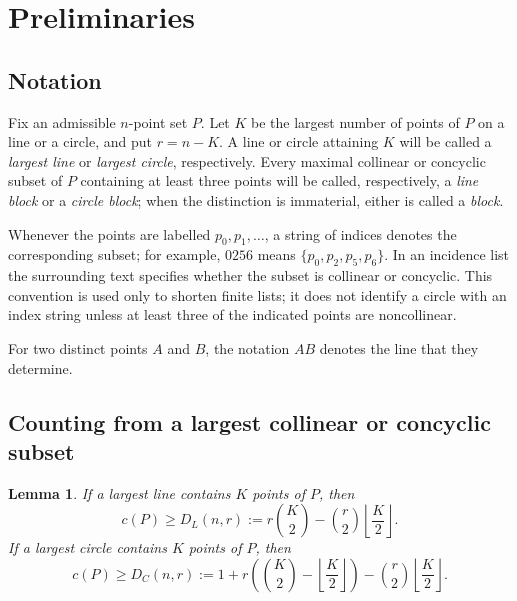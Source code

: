 \documentclass[11pt,a4paper]{article}
\newtheorem{lemma}[theorem]{Lemma}
\theoremstyle{definition}
\begin{document}
\section{Preliminaries}

\subsection{Notation}

Fix an admissible $n$-point set $P$.  Let $K$ be the largest number of points of
$P$ on a line or a circle, and put $r=n-K$.  A line or circle attaining $K$ will be
called a \emph{largest line} or \emph{largest circle}, respectively.
Every maximal collinear or concyclic subset of $P$ containing at least three
points will be called, respectively, a \emph{line block} or a \emph{circle block};
when the distinction is immaterial, either is called a \emph{block}.

Whenever the points are labelled $p_0,p_1,\ldots$, a string of indices denotes
the corresponding subset; for example, $0256$ means
$\{p_0,p_2,p_5,p_6\}$.  In an incidence list the surrounding text specifies
whether the subset is collinear or concyclic.  This convention is used only to
shorten finite lists; it does not identify a circle with an index string unless
at least three of the indicated points are noncollinear.

For two distinct points $A$ and $B$, the notation $AB$ denotes the line that
they determine.

\subsection{Counting from a largest collinear or concyclic subset}

\begin{lemma}\label{lem:largest-en}
If a largest line contains $K$ points of $P$, then
\begin{equation}\label{eq:DL-en}
c(P)\ge D_L(n,r):=r\binom K2-\binom r2\left\lfloor\frac K2\right\rfloor.
\end{equation}
If a largest circle contains $K$ points of $P$, then
\begin{equation}\label{eq:DC-en}
c(P)\ge D_C(n,r):=1+r\left(\binom K2-\left\lfloor\frac K2\right\rfloor\right)
-\binom r2\left\lfloor\frac K2\right\rfloor.
\end{equation}
\end{lemma}
\end{document}
